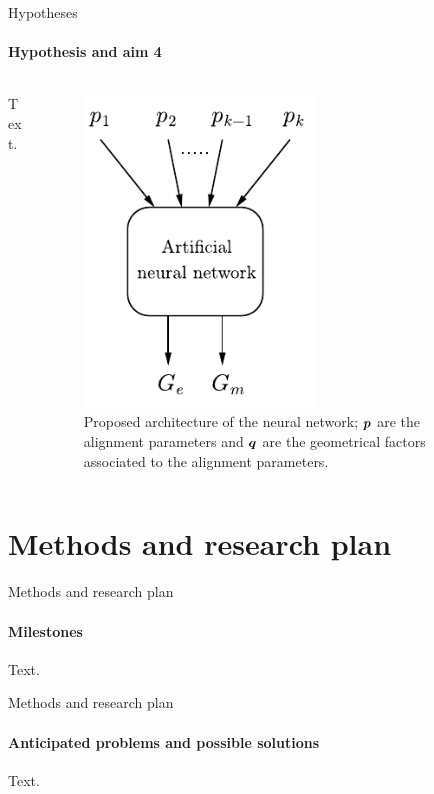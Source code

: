 \documentclass{beamer}
\begin{document}
\begin{frame}[allowframebreaks]{Hypotheses}
  \framesubtitle{Hypothesis and aim 4}

  \begin{columns}
    \begin{column}{0.49\textwidth}
    Text.
    \end{column}
    
    \begin{column}{0.5\textwidth}
      \begin{figure}[h!] 
	\centering
	\includegraphics[width=0.6\textwidth]{figures/nn.pdf}
	\caption{Proposed architecture of the neural network; $\bm{p}$ are the alignment parameters and $\bm{q}$ are the geometrical factors associated to the alignment parameters.}
	\label{fig:nn}
      \end{figure}
    \end{column}
  \end{columns}
\end{frame}

\section{Methods and research plan}
\begin{frame}[allowframebreaks]{Methods and research plan}
  \framesubtitle{Milestones}
    Text.
\end{frame}

\begin{frame}[allowframebreaks]{Methods and research plan}
  \framesubtitle{Anticipated problems and possible solutions}
  Text.
\end{frame}
\end{document}
